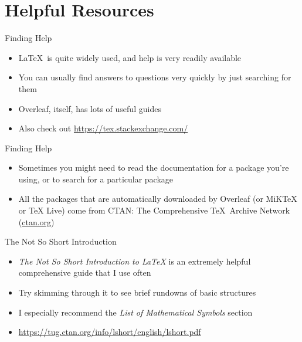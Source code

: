 \documentclass{beamer} %
\begin{document}
\section{Helpful Resources}

\begin{frame}{Finding Help}

\begin{itemize}
	\item \LaTeX\ is quite widely used, and help is very readily available
	\item You can usually find answers to questions very quickly by just searching for them
	\item Overleaf, itself, has lots of useful guides
	\item Also check out \url{https://tex.stackexchange.com/}
\end{itemize}

\end{frame}

\begin{frame}{Finding Help}

\begin{itemize}
	\item Sometimes you might need to read the documentation for a package you're using, or to search for a particular package
	\item All the packages that are automatically downloaded by Overleaf (or MiKTeX or TeX Live) come from CTAN: The Comprehensive \TeX\ Archive Network (\url{ctan.org})
\end{itemize}

\end{frame}

\begin{frame}{The Not So Short Introduction}

\begin{itemize}
	\item \textit{The Not So Short Introduction to \LaTeX} is an extremely helpful comprehensive guide that I use often
	\item Try skimming through it to see brief rundowns of basic structures
	\item I especially recommend the \textit{List of Mathematical Symbols} section
	\item \url{https://tug.ctan.org/info/lshort/english/lshort.pdf}
\end{itemize}

\end{frame}
\end{document}
